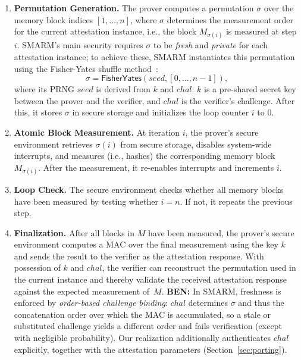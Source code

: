\documentclass{ieeeaccess}
\DeclareRobustCommand{\ben}[1]{{\color{BENcolor}\textbf{BEN:} #1}}
\begin{document}
\begin{enumerate}
    \item \textbf{Permutation Generation.}
    The prover computes a permutation $\sigma$ over the memory block indices $[1,\ldots,n]$, where $\sigma$ determines the measurement order for the current attestation instance, i.e., the block $M_{\sigma(i)}$ is measured at step $i$.
    SMARM's main security requires $\sigma$ to be \emph{fresh} and \emph{private} for each attestation instance;
    to achieve these, SMARM instantiates this permutation using the Fisher-Yates shuffle method~\cite{fisherYates}:
    \[
        \sigma = \mathsf{FisherYates}(seed, [0,\ldots,n-1]),
    \]
    where its PRNG $seed$ is derived from $k$ and $chal$: $k$ is a pre-shared secret key between the prover and the verifier, and $chal$ is the verifier’s challenge.
    After this, it stores $\sigma$ in secure storage and initializes the loop counter $i$ to $0$.

    \item \textbf{Atomic Block Measurement.}
    At iteration $i$, the prover's secure environment retrieves $\sigma(i)$ from secure storage, disables system-wide interrupts, and measures (i.e., hashes) the corresponding memory block $M_{\sigma(i)}$.
    After the measurement, it re-enables interrupts and increments $i$.

    \item \textbf{Loop Check.}
    The secure environment checks whether all memory blocks have been measured by testing whether $i = n$.
    If not, it repeats the previous step.

    \item \textbf{Finalization.}
    After all blocks in $M$ have been measured, the prover's secure environment computes a MAC over the final measurement using the key $k$ and sends the result to the verifier as the attestation response.
    With possession of $k$ and $chal$, the verifier can reconstruct the permutation used in the current instance and thereby validate the received attestation response against the expected measurement of~$M$.
    \ben{In SMARM, freshness is enforced by \emph{order-based challenge binding}: $chal$ determines $\sigma$ and thus the concatenation order over which the MAC is accumulated, so a stale or substituted challenge yields a different order and fails verification (except with negligible probability).
    Our realization additionally authenticates $chal$ explicitly, together with the attestation parameters (Section~\ref{sec:porting}).}
\end{enumerate}
\end{document}
